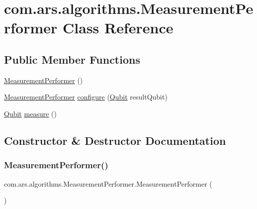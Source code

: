 \hypertarget{classcom_1_1ars_1_1algorithms_1_1_measurement_performer}{}\section{com.\+ars.\+algorithms.\+Measurement\+Performer Class Reference}
\label{classcom_1_1ars_1_1algorithms_1_1_measurement_performer}
\subsection*{Public Member Functions}
\begin{DoxyCompactItemize}
\item 
\hyperlink{classcom_1_1ars_1_1algorithms_1_1_measurement_performer_a5f0477b1d710b377fe950a11e188316a}{Measurement\+Performer} ()
\item 
\hyperlink{classcom_1_1ars_1_1algorithms_1_1_measurement_performer}{Measurement\+Performer} \hyperlink{classcom_1_1ars_1_1algorithms_1_1_measurement_performer_a2859e53e337d327fe64711724ef46175}{configure} (\hyperlink{classcom_1_1ars_1_1qubits_1_1_qubit}{Qubit} result\+Qubit)
\item 
\hyperlink{classcom_1_1ars_1_1qubits_1_1_qubit}{Qubit} \hyperlink{classcom_1_1ars_1_1algorithms_1_1_measurement_performer_aaa613379c40e0b083f5ce81e6ba59f72}{measure} ()
\end{DoxyCompactItemize}


\subsection{Constructor \& Destructor Documentation}
\hypertarget{classcom_1_1ars_1_1algorithms_1_1_measurement_performer_a5f0477b1d710b377fe950a11e188316a}{}\label{classcom_1_1ars_1_1algorithms_1_1_measurement_performer_a5f0477b1d710b377fe950a11e188316a} 
\subsubsection{\texorpdfstring{Measurement\+Performer()}{MeasurementPerformer()}}
{\footnotesize\ttfamily com.\+ars.\+algorithms.\+Measurement\+Performer.\+Measurement\+Performer (\begin{DoxyParamCaption}{ }\end{DoxyParamCaption})}



